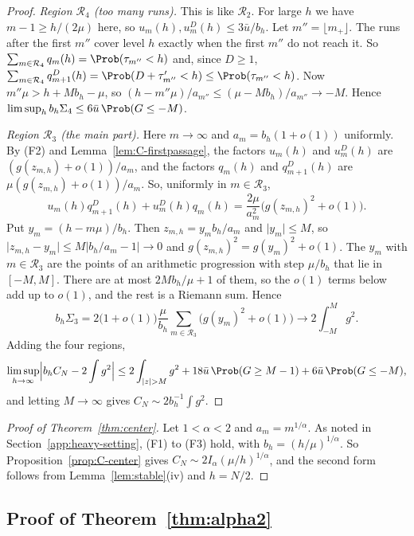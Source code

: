 \begin{proof}
\emph{Region $\mathcal R_4$ (too many runs).} This is like $\mathcal R_2$. For large $h$
we have $m-1\ge h/(2\mu)$ here, so $u_m(h),u^D_m(h)\le3\bar u/b_h$. Let
$m''=\lfloor m_+\rfloor$. The runs after the first $m''$ cover level $h$ exactly when
the first $m''$ do not reach it. So $\sum_{m\in\mathcal R_4}q_m(h)=\Prob(\tau_{m''}<h)$
and, since $D\ge1$,
$\sum_{m\in\mathcal R_4}q^D_{m+1}(h)=\Prob(D+\tau'_{m''}<h)\le\Prob(\tau_{m''}<h)$. Now
$m''\mu>h+Mb_h-\mu$, so $(h-m''\mu)/a_{m''}\le(\mu-Mb_h)/a_{m''}\to-M$. Hence
$\limsup_hb_h\Sigma_4\le6\bar u\,\Prob(G\le-M)$.

\emph{Region $\mathcal R_3$ (the main part).} Here $m\to\infty$ and
$a_m=b_h(1+o(1))$ uniformly. By (F2) and Lemma~\ref{lem:C-firstpassage}, the factors
$u_m(h)$ and $u^D_m(h)$ are $(g(z_{m,h})+o(1))/a_m$, and the factors $q_m(h)$ and
$q^D_{m+1}(h)$ are $\mu(g(z_{m,h})+o(1))/a_m$. So, uniformly in $m\in\mathcal R_3$,
\[
u_m(h)q^D_{m+1}(h)+u^D_m(h)q_m(h)=\frac{2\mu}{a_m^2}\bigl(g(z_{m,h})^2+o(1)\bigr).
\]
Put $y_m=(h-m\mu)/b_h$. Then $z_{m,h}=y_mb_h/a_m$ and $\lvert y_m\rvert\le M$, so
$\lvert z_{m,h}-y_m\rvert\le M\lvert b_h/a_m-1\rvert\to0$ and
$g(z_{m,h})^2=g(y_m)^2+o(1)$. The $y_m$ with $m\in\mathcal R_3$ are the points of an
arithmetic progression with step $\mu/b_h$ that lie in $[-M,M]$. There are at most
$2Mb_h/\mu+1$ of them, so the $o(1)$ terms below add up to $o(1)$, and the rest is a
Riemann sum. Hence
\[
b_h\Sigma_3=2\bigl(1+o(1)\bigr)\frac\mu{b_h}
\sum_{m\in\mathcal R_3}\bigl(g(y_m)^2+o(1)\bigr)\to2\int_{-M}^Mg^2 .
\]
Adding the four regions,
\[
\limsup_{h\to\infty}\Bigl\lvert b_hC_N-2\int g^2\Bigr\rvert
\le2\int_{\lvert z\rvert>M}g^2+18\bar u\,\Prob(G\ge M-1)+6\bar u\,\Prob(G\le-M),
\]
and letting $M\to\infty$ gives $C_N\sim2b_h^{-1}\int g^2$.
\end{proof}

\begin{proof}[Proof of Theorem~\ref{thm:center}]
Let $1<\alpha<2$ and $a_m=m^{1/\alpha}$. As noted in
Section~\ref{app:heavy-setting}, (F1) to (F3) hold, with $b_h=(h/\mu)^{1/\alpha}$. So
Proposition~\ref{prop:C-center} gives $C_N\sim2I_\alpha(\mu/h)^{1/\alpha}$, and the
second form follows from Lemma~\ref{lem:stable}(iv) and $h=N/2$.
\end{proof}

\subsection{Proof of Theorem~\ref{thm:alpha2}}\label{app:heavy-alpha2}

